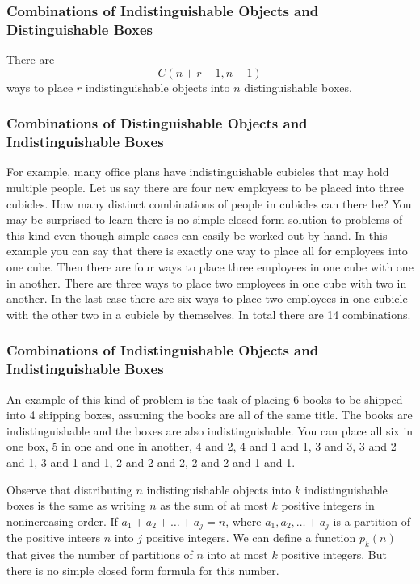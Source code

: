 \subsubsection{Combinations of Indistinguishable Objects and Distinguishable Boxes}
\begin{theorem}
There are 
$$C(n+r-1,n-1)$$
ways to place $r$ indistinguishable objects into $n$ distinguishable boxes.
\end{theorem}

\subsubsection{Combinations of Distinguishable Objects and Indistinguishable Boxes}
For example, many office plans have indistinguishable cubicles that may hold multiple people. Let us say there are four new employees to be placed into three cubicles. How many distinct combinations of people in cubicles can there be? You may be surprised to learn there is no simple closed form solution to problems of this kind even though simple cases can easily be worked out by hand. In this example you can say that there is exactly one way to place all for employees into one cube. Then there are four ways to place three employees in one cube with one in another. There are three ways to place two employees in one cube with two in another. In the last case there are six ways to place two employees in one cubicle with the other two in a cubicle by themselves. In total there are 14 combinations. 

\subsubsection{Combinations of Indistinguishable Objects and Indistinguishable Boxes}
An example of this kind of problem is the task of placing 6 books to be shipped into 4 shipping boxes, assuming the books are all of the same title. The books are indistinguishable and the boxes are also indistinguishable. You can place all six in one box, 5 in one and one in another, 4 and 2, 4 and 1 and 1, 3 and 3, 3 and 2 and 1, 3 and 1 and 1, 2 and 2 and 2, 2 and 2 and 1 and 1. 

Observe that distributing $n$ indistinguishable objects into $k$ indistinguishable boxes is the same as writing $n$ as the sum of at most $k$ positive integers in nonincreasing order. If $a_1+a_2+ \dots +a_j=n$, where $a_1,a_2, \dots +a_j$ is a partition of the positive inteers $n$ into $j$ positive integers. We can define a function $p_k(n)$ that gives the number of partitions of $n$ into at most $k$ positive integers. But there is no simple closed form formula for this number.


